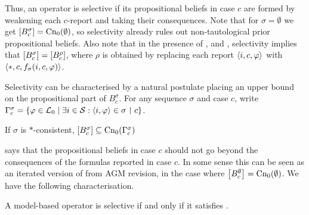 Thus, an operator is selective if its propositional beliefs in case $c$ are
formed by weakening each $c$-report and taking their consequences. Note that for
$\sigma = \emptyset$ we get $\left[{B^\sigma_c}\right] = \operatorname{Cn}_0(\emptyset)$, so
selectivity already rules out non-tautological prior propositional beliefs.
Also note that in the presence of \closure{}, \containment{} and \soundness{},
selectivity implies that $\left[{B^\sigma_c}\right] = \left[{B^\rho_c}\right]$, where
$\rho$ is obtained by replacing each report $\langle {i, c, \varphi} \rangle$ with
$\langle {\ast, c, f_\sigma(i, c, \varphi)} \rangle$.

Selectivity can be characterised by a natural postulate placing an upper bound
on the propositional part of $B^\sigma_c$. For any sequence $\sigma$ and case
$c$, write $\Gamma^\sigma_c = \{\varphi \in \mathcal{L}{}_0 \mid \exists i \in \mathcal{S}:
\langle {i, \varphi} \rangle \in \sigma \upharpoonright c\}$.

\begin{axiom}[\boundedness{}]
    If $\sigma$ is $\ast$-consistent, $\left[{B^\sigma_c}\right]
    \subseteq \operatorname{Cn}_0(\Gamma^\sigma_c)$
\end{axiom}

\boundedness{} says that the propositional beliefs in case $c$ should not go
beyond the consequences of the formulas reported in case $c$. In some sense
this can be seen as an iterated version of  from AGM
revision, in the case where $\left[{B^\emptyset_c}\right] = \operatorname{Cn}_0(\emptyset)$. We
have the following characterisation.

\begin{theorem}
    \label{kr_thm_selectivity_characterisation}
    A model-based operator is selective if and only if it satisfies
    \boundedness{}.
\end{theorem}

